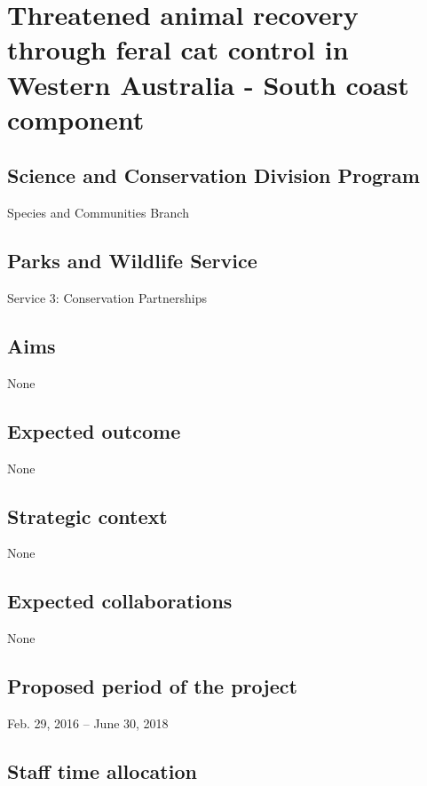 \documentclass[version=last,
    paper=a4, %
    10pt, %
    usenames,
    dvipsnames,
    oneside, %
    headings=openany, %
    DIV=15 %
]{scrbook}
\begin{document}
\section*{Threatened animal recovery through feral cat control in Western
Australia - South coast component
}


\subsection*{Science and Conservation Division Program}
Species and Communities Branch



\subsection*{Parks and Wildlife Service}
Service 3: Conservation Partnerships



\subsection*{Aims}
None



\subsection*{Expected outcome}
None



\subsection*{Strategic context}
None



\subsection*{Expected collaborations}
None


\subsection*{Proposed period of the project}
Feb. 29, 2016 -- June 30, 2018



\subsection*{Staff time allocation }
\end{document}
